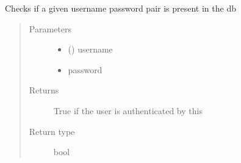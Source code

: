 \documentclass[letterpaper,10pt,english]{sphinxmanual}
\begin{document}
\begin{fulllineitems}
\label{\detokenize{db:db.db_login}}
Checks if a given username password pair is present in the db
\begin{quote}\begin{description}
\item[{Parameters}] \leavevmode\begin{itemize}
\item {} 
 () \textendash{} username

\item {} 
 \textendash{} password

\end{itemize}

\item[{Returns}] \leavevmode
True if the user is authenticated by this

\item[{Return type}] \leavevmode
bool

\end{description}\end{quote}

\end{fulllineitems}

\end{document}
